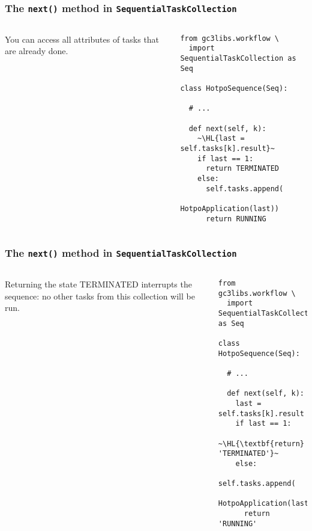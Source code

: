 \documentclass[english,serif,mathserif,xcolor=pdftex,dvipsnames,table]{beamer}
\begin{document}
\begin{frame}[fragile]
  \frametitle{The \texttt{next()} method in \texttt{SequentialTaskCollection}}
  \label{sec:14}

  \begin{columns}
    You can access all attributes of tasks that are already done.

    \begin{lstlisting}[basicstyle=\ttfamily\footnotesize]
from gc3libs.workflow \
  import SequentialTaskCollection as Seq

class HotpoSequence(Seq):

  # ...

  def next(self, k):
    ~\HL{last = self.tasks[k].result}~
    if last == 1:
      return TERMINATED
    else:
      self.tasks.append(
        HotpoApplication(last))
      return RUNNING
    \end{lstlisting}
  \end{columns}
\end{frame}


\begin{frame}[fragile]
  \frametitle{The \texttt{next()} method in \texttt{SequentialTaskCollection}}
  \label{sec:14}

  \begin{columns}
    Returning the state TERMINATED interrupts the
    sequence: no other tasks from this collection will be run.

    \begin{lstlisting}[basicstyle=\ttfamily\footnotesize]
from gc3libs.workflow \
  import SequentialTaskCollection as Seq

class HotpoSequence(Seq):

  # ...

  def next(self, k):
    last = self.tasks[k].result
    if last == 1:
      ~\HL{\textbf{return} 'TERMINATED'}~
    else:
      self.tasks.append(
        HotpoApplication(last))
      return 'RUNNING'
    \end{lstlisting}
  \end{columns}
\end{frame}
\end{document}
